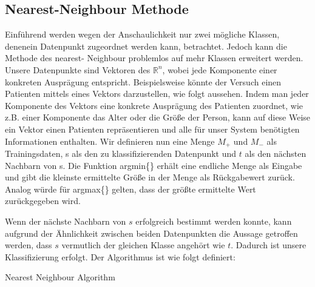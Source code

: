 \documentclass[fontsize=11pt]{scrartcl}
\begin{document}
            \subsection{Nearest-Neighbour Methode}
                Einführend werden wegen der Anschaulichkeit nur zwei mögliche Klassen, denenein Datenpunkt zugeordnet werden kann, betrachtet. Jedoch kann die Methode des nearest- Neighbour problemlos auf mehr Klassen erweitert werden.
                Unsere Datenpunkte sind Vektoren des $\mathbb{R}^n$, wobei jede Komponente einer konkreten Ausprägung entspricht. 
                Beispielsweise könnte der Versuch einen Patienten mittels eines Vektors darzustellen, wie folgt aussehen. Indem man jeder Komponente des Vektors eine konkrete Ausprägung des Patienten zuordnet, wie z.B. einer Komponente das Alter oder die Größe der Person, kann auf diese Weise ein Vektor einen Patienten repräsentieren und alle für unser System benötigten Informationen enthalten.
                Wir definieren nun eine Menge $M_+$ und $M_-$ als Trainingsdaten, s als den zu klassifizierenden Datenpunkt und $t$ als den nächsten Nachbarn von s. Die Funktion argmin\{\} erhält eine endliche Menge als Eingabe und gibt die kleinste ermittelte Größe in der Menge als Rückgabewert zurück. Analog würde für argmax\{\} gelten, dass der größte ermittelte Wert zurückgegeben wird.
                        
                Wenn der nächste Nachbarn von $s$ erfolgreich bestimmt werden konnte, kann aufgrund der Ähnlichkeit zwischen beiden Datenpunkten die Aussage getroffen werden, dass $s$ vermutlich der gleichen Klasse angehört wie $t$. Dadurch ist unsere Klassifizierung erfolgt.
                Der Algorithmus ist wie folgt definiert:\\
                \begin{algorithm}[H]
                        {
                            \KwRet{-}\;
                        }
                    \caption{Nearest Neighbour Algorithm}
                \end{algorithm}
                        
\end{document}
